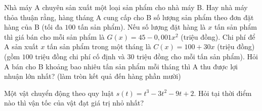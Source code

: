 \begin{bt}%
	Nhà máy A chuyên sản xuất một loại sản phẩm cho nhà máy B. Hay nhà máy thỏa thuận rằng, hàng tháng A cung cấp cho B số lượng sản phẩm theo đơn đặt hàng của B (tối đa $100$ tấn sản phẩm). Nếu số lượng đặt hàng là $x$ tấn sản phẩm thì giá bán cho mỗi sản phẩm là $G(x)=45-0{,}001x^2$ (triệu đồng). Chi phí để A sản xuất $x$ tấn sản phẩm trong một tháng là $C(x)=100+30x$ (triệu đồng) (gồm $100$ triệu đồng chi phí cố định và $30$ triệu đồng cho mỗi tấn sản phẩm). Hỏi A bán cho B khoảng bao nhiêu tấn sản phẩm mỗi tháng thì A thu được lợi nhuận lớn nhất? (làm tròn kết quả đến hàng phần mười)
\end{bt}

\begin{bt}%

	Một vật chuyển động theo quy luật $s(t)=t^3-3t^2-9t+2$. Hỏi tại thời điểm nào thì vận tốc của vật đạt giá trị nhỏ nhất?
	
\end{bt}

